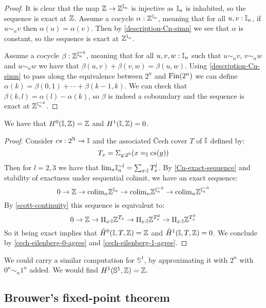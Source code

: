 \begin{proof}
It is clear that the map $\mathbb{Z}\to \mathbb{Z}^{\mathbb{I}_n}$ is injective as $\mathbb{I}_n$ is inhabited, so the sequence is exact at $\mathbb{Z}$. Assume a cocycle $\alpha:\mathbb{Z}^{\mathbb{I}_n}$, meaning that for all $u,v:\mathbb{I}_n$, if $u\sim_nv$ then $\alpha(u)=\alpha(v)$. Then by \cref{description-Cn-simn} we see that $\alpha$ is constant, so the sequence is exact at $\mathbb{Z}^{\mathbb{I}_n}$.

Assume a cocycle $\beta:\mathbb{Z}^{\mathbb{I}_n^{\sim2}}$, meaning that for all $u,v,w:\mathbb{I}_n$ such that $u\sim_nv$, $v\sim_nw$ and $u\sim_nw$ we have that $\beta(u,v)+\beta(v,w) = \beta(u,w)$. %
Using \cref{description-Cn-simn} to pass along the equivalence between $2^n$ and $\operatorname{Fin}(2^n)$ we can define $\alpha(k) = \beta(0,1)+\cdots+\beta(k-1,k)$.
We can check that $\beta(k,l) = \alpha(l)-\alpha(k)$, so $\beta$ is indeed a coboundary and the sequence is exact at $\mathbb{Z}^{\mathbb{I}_n^{\sim2}}$.
\end{proof}

\begin{proposition}\label{cohomology-I}
We have that $H^0(\mathbb{I},\mathbb{Z}) = \mathbb{Z}$ and $H^1(\mathbb{I},\mathbb{Z}) = 0$.
\end{proposition}

\begin{proof}
Consider $cs:2^{\mathbb{N}}\to\mathbb{I}$ and the associated \v{C}ech cover $T$ of $\mathbb{I}$ defined by: 
\[T_x = \Sigma_{y:2^{\mathbb{N}}} (x=_{\mathbb{I}} cs(y))\]
Then for $l=2,3$ we have that $\mathrm{lim}_n\mathbb{I}_n^{\sim l} = \sum_{x:\mathbb{I}} T_x^l$. By \cref{Cn-exact-sequence} and stability of exactness under sequential colimit, we have an exact sequence:
\[ 0\to \mathbb{Z}\to \mathrm{colim}_n \mathbb{Z}^{\mathbb{I}_n} \to \mathrm{colim}_n \mathbb{Z}^{\mathbb{I}_n^{\sim2}}\to \mathrm{colim}_n \mathbb{Z}^{\mathbb{I}_n^{\sim3}}\]
By \cref{scott-continuity} this sequence is equivalent to:
\[ 0\to \mathbb{Z}\to \Pi_{x:\mathbb{I}}\mathbb{Z}^{T_x} \to  \Pi_{x:\mathbb{I}}\mathbb{Z}^{T_x^2} \to  \Pi_{x:\mathbb{I}}\mathbb{Z}^{T_x^3}\]
So it being exact implies that $\check{H}^0(\mathbb{I},T,\mathbb{Z}) = \mathbb{Z}$ and $\check{H}^1(\mathbb{I},T,\mathbb{Z}) = 0$.
We conclude by \cref{cech-eilenberg-0-agree} and \cref{cech-eilenberg-1-agree}.
\end{proof}

\begin{remark}
We could carry a similar computation for $\mathbb{S}^1$, by approximating it with $2^n$ with $0^n\sim_n1^n$ added. We would find $H^1(\mathbb{S}^1,\mathbb{Z})=\mathbb{Z}$.
\end{remark}


\subsection{Brouwer's fixed-point theorem}


